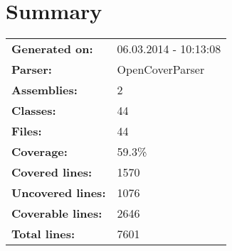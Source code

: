 \documentclass[a4paper,10pt]{article}
\begin{document}
\setcounter{secnumdepth}{-1}
\section{Summary}
\begin{longtable}[l]{ll}
\textbf{Generated on:} & 06.03.2014 - 10:13:08\\
\textbf{Parser:} & OpenCoverParser\\
\textbf{Assemblies:} & 2\\
\textbf{Classes:} & 44\\
\textbf{Files:} & 44\\
\textbf{Coverage:} & 59.3\%\\
\textbf{Covered lines:} & 1570\\
\textbf{Uncovered lines:} & 1076\\
\textbf{Coverable lines:} & 2646\\
\textbf{Total lines:} & 7601\\
\end{longtable}
\end{document}

